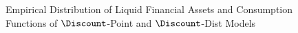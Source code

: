 \begin{figure}
\caption{Empirical Distribution of Liquid Financial Assets and Consumption Functions of $\Discount$-Point and $\Discount$-Dist Models}
\label{CFuncDistSevenAndHistNetWorthLiqFinPlot}
\end{figure}
